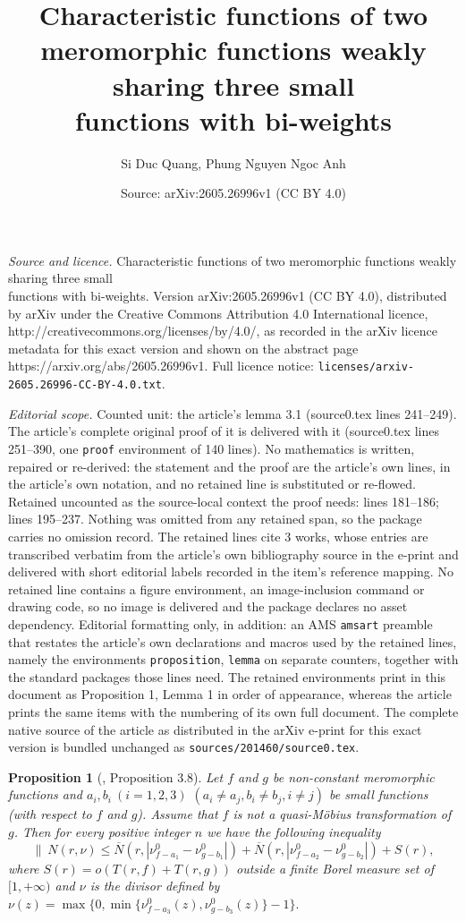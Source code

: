 \documentclass[10pt,a4paper]{amsart}
\title{Characteristic functions of two meromorphic functions weakly sharing three small\\ functions with bi-weights}
\author{Si Duc Quang, Phung Nguyen Ngoc Anh}
\date{Source: arXiv:2605.26996v1 (CC BY 4.0)}
\newtheorem{proposition}{Proposition}
\begin{document}
\maketitle

\noindent\emph{Source and licence.} Characteristic functions of two meromorphic functions weakly sharing three small\\ functions with bi-weights. Version arXiv:2605.26996v1 (CC BY 4.0), distributed by arXiv under the Creative Commons Attribution 4.0 International licence, http://creativecommons.org/licenses/by/4.0/, as recorded in the arXiv licence metadata for this exact version and shown on the abstract page https://arxiv.org/abs/2605.26996v1. Full licence notice: \texttt{licenses/arxiv-2605.26996-CC-BY-4.0.txt}.\par\smallskip

\noindent\textit{Editorial scope.} Counted unit: the article's lemma 3.1 (source0.tex lines 241--249). The article's complete original proof of it is delivered with it (source0.tex lines 251--390, one \texttt{proof} environment of 140 lines). No mathematics is written, repaired or re-derived: the statement and the proof are the article's own lines, in the article's own notation, and no retained line is substituted or re-flowed.  Retained uncounted as the source-local context the proof needs: lines 181--186; lines 195--237.  Nothing was omitted from any retained span, so the package carries no omission record.  The retained lines cite 3 works, whose entries are transcribed verbatim from the article's own bibliography source in the e-print and delivered with short editorial labels recorded in the item's reference mapping.  No retained line contains a figure environment, an image-inclusion command or drawing code, so no image is delivered and the package declares no asset dependency.  Editorial formatting only, in addition: an AMS \texttt{amsart} preamble that restates the article's own declarations and macros used by the retained lines, namely the environments \texttt{proposition}, \texttt{lemma} on separate counters, together with the standard packages those lines need.  The retained environments print in this document as Proposition 1, Lemma 1 in order of appearance, whereas the article prints the same items with the numbering of its own full document.  The complete native source of the article as distributed in the arXiv e-print for this exact version is bundled unchanged as \texttt{sources/201460/source0.tex}.
\begin{proposition}[\cite{QA}, Proposition 3.8]\label{2.2}
Let $f$ and $g$ be non-constant meromorphic functions and $a_i,b_i\ (i=1,2,3)$ $ (a_i\ne a_j, b_i\ne b_j, i\ne j)$ be small functions (with respect to $f$ and $g$). Assume that $f$ is not a quasi-M\"{o}bius transformation of $g$. Then for every positive integer $n$ we have the following inequality
$$\|\  N(r,\nu)\le \overline N(r,|\nu^0_{f-a_1}-\nu^0_{g-b_1}|)+\overline N(r,|\nu^0_{f-a_2}-\nu^0_{g-b_2}|)+S(r), $$
where $S(r)=o(T(r,f)+T(r,g))$ outside a finite Borel measure set of $[1,+\infty)$ and $\nu$ is the divisor defined by 
$\nu (z)=\max\{0,\min\{\nu^0_{f-a_3}(z),\nu^0_{g-b_3}(z)\}-1\}.$
\end{proposition}
\end{document}
